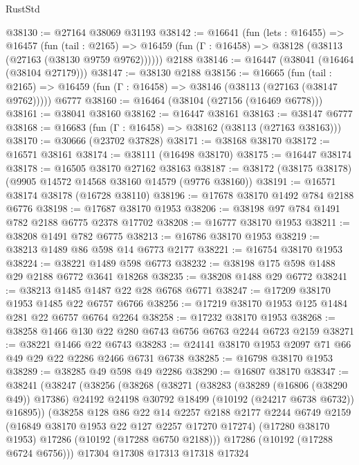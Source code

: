 \begin{lexlean}{RustStd}
\begin{coremodule}
@38130 := @27164 @38069 @31193
@38142 := @16641
    (fun (lets : @16455) =>
    @16457
      (fun (tail : @2165) =>
      @16459 (fun (Γ : @16458) => @38128 (@38113 (@27163 (@38130 @9759 @9762))))))
    @2188
@38146 := @16447 (@38041 (@16464 (@38104 @27179)))
@38147 := @38130 @2188
@38156 := @16665
    (fun (tail : @2165) => @16459 (fun (Γ : @16458) => @38146 (@38113 (@27163 (@38147 @9762)))))
    @6777
@38160 := @16464 (@38104 (@27156 (@16469 @6778)))
@38161 := @38041 @38160
@38162 := @16447 @38161
@38163 := @38147 @6777
@38168 := @16683 (fun (Γ : @16458) => @38162 (@38113 (@27163 @38163)))
@38170 := @30666 (@23702 @37828)
@38171 := @38168 @38170
@38172 := @16571 @38161
@38174 := @38111 (@16498 @38170)
@38175 := @16447 @38174
@38178 := @16505 @38170 @27162 @38163
@38187 := @38172 (@38175 @38178) (@9905 @14572 @14568 @38160 @14579 (@9776 @38160))
@38191 := @16571 @38174 @38178 (@16728 @38110)
@38196 := @17678 @38170 @1492 @784 @2188 @6776
@38198 := @17687 @38170 @1953
@38206 := @38198 @97 @784 @1491 @782 @2188 @6775 @2378 @17702
@38208 := @16777 @38170 @1953
@38211 := @38208 @1491 @782 @6775
@38213 := @16786 @38170 @1953
@38219 := @38213 @1489 @86 @598 @14 @6773 @2177
@38221 := @16754 @38170 @1953
@38224 := @38221 @1489 @598 @6773
@38232 := @38198 @175 @598 @1488 @29 @2188 @6772 @3641 @18268
@38235 := @38208 @1488 @29 @6772
@38241 := @38213 @1485 @1487 @22 @28 @6768 @6771
@38247 := @17209 @38170 @1953 @1485 @22 @6757 @6766
@38256 := @17219 @38170 @1953 @125 @1484 @281 @22 @6757 @6764 @2264
@38258 := @17232 @38170 @1953
@38268 := @38258 @1466 @130 @22 @280 @6743 @6756 @6763 @2244 @6723 @2159
@38271 := @38221 @1466 @22 @6743
@38283 := @24141 @38170 @1953 @2097 @71 @66 @49 @29 @22 @2286 @2466 @6731 @6738
@38285 := @16798 @38170 @1953
@38289 := @38285 @49 @598 @49 @2286
@38290 := @16807 @38170
@38347 := @38241
    (@38247
      (@38256
        (@38268
          (@38271
            (@38283
              (@38289 (@16806 (@38290 @49)) @17386)
              @24192
              @24198
              @30792
              @18499
              (@10192 (@24217 @6738 @6732))
              @16895))
          (@38258
            @128
            @86
            @22
            @14
            @2257
            @2188
            @2177
            @2244
            @6749
            @2159
            (@16849 @38170 @1953 @22 @127 @2257 @17270 @17274)
            (@17280 @38170 @1953)
            @17286
            (@10192 (@17288 @6750 @2188)))
          @17286
          (@10192 (@17288 @6724 @6756)))
        @17304
        @17308
        @17313
        @17318
        @17324

\end{coremodule}
\end{lexlean}
